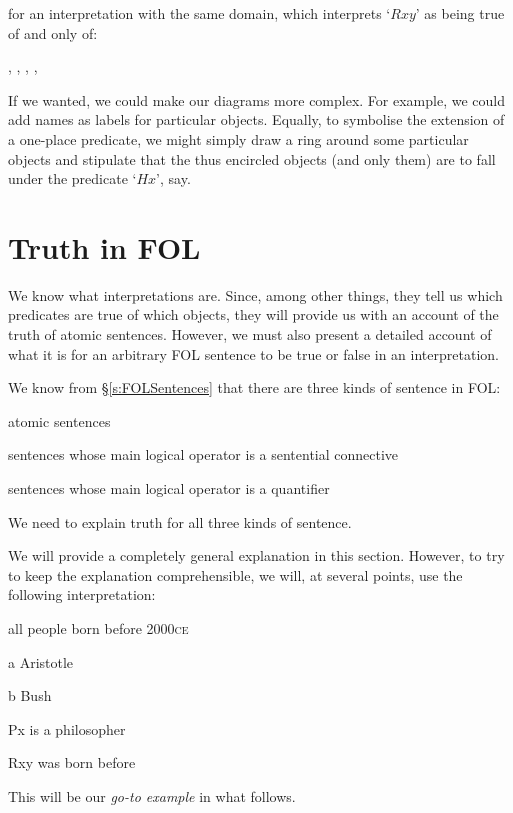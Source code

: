 \begin{center}
\end{center}
for an interpretation with the same domain, which interprets `$Rxy$' as being true of and only of:
	\begin{center}
		, 
		, 
		, 
		,
	\end{center}
If we wanted, we could make our diagrams more complex. For example, we could add names as labels for particular objects. Equally, to symbolise the extension of a one-place predicate, we might simply draw a ring around some particular objects and stipulate that the thus encircled objects (and only them) are to fall under the predicate `$Hx$', say. 


\chapter{Truth in FOL}\label{s:TruthFOL}
We know what interpretations are. Since, among other things, they tell us which predicates are true of which objects, they will provide us with an account of the truth of atomic sentences. However, we must also present a detailed account of what it is for an arbitrary FOL sentence to be true or false in an interpretation. 

We know from \S\ref{s:FOLSentences} that there are three kinds of sentence in FOL: 
	\begin{ebullet}
		\item atomic sentences
		\item sentences whose main logical operator is a sentential connective
		\item sentences whose main logical operator is a quantifier
	\end{ebullet}
We need to explain truth for all three kinds of sentence.

We will provide a completely general explanation in this section. However, to try to keep the explanation comprehensible, we will, at several points, use the following interpretation:
	\begin{ekey}
		\item[\text{domain}] all people born before 2000\textsc{ce}
		\item[a] Aristotle
		\item[b] Bush
		\item[Px]  is a philosopher
		\item[Rxy]  was born before 
	\end{ekey}
This will be our \emph{go-to example} in what follows.

